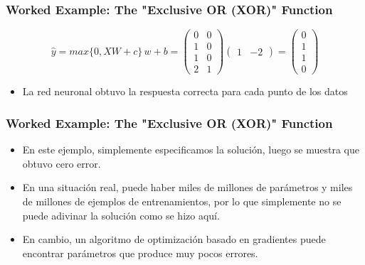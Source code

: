 \documentclass[
  shownotes,
  xcolor={svgnames},
  hyperref={colorlinks,citecolor=DarkBlue,linkcolor=DarkRed,urlcolor=DarkBlue}
  , aspectratio=169]{beamer}
\begin{document}
\begin{frame}
\frametitle{Worked Example: The "Exclusive OR (XOR)" Function}


\[
\hat{y}=max\{0,XW+c\}\,w + b=\left(\begin{array}{cc}
0 & 0\\
1 & 0\\
1 & 0\\
2 & 1
\end{array}\right)\left(\begin{array}{cc}
1 & -2\end{array}\right)=\left(\begin{array}{c}
0\\
1\\
1\\
0
\end{array}\right)
\]

\vspace{2cm}
\begin{itemize}
\item La red neuronal obtuvo la respuesta correcta para cada punto de los datos 
\end{itemize}

\end{frame}
\begin{frame}
\frametitle{Worked Example: The "Exclusive OR (XOR)" Function}

\begin{itemize}
\item En este ejemplo, simplemente especificamos la solución, luego se muestra que
obtuvo cero error.
\item En una situación real, puede haber miles de millones de parámetros y
miles de millones de ejemplos de entrenamientos, por lo que simplemente no se puede  adivinar la solución
como se hizo aquí.
\item En cambio, un algoritmo de optimización basado en gradientes puede encontrar parámetros
que produce muy pocos errores. 
\end{itemize}


\end{frame}
\end{document}

